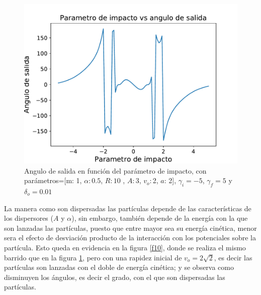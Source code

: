 \documentclass[11pt,letterpaper,twocolumn]{article}
\begin{document}
\begin{figure}[H]
\centering 
\includegraphics[scale=0.59]{g11.pdf}
\caption{Angulo de salida en función del parámetro de impacto, con parámetros=[m: 1, $\alpha: 0$.$5$, $R: 10$ , $A: 3$, $ v_{o}: $2, $a$: 2], $\gamma_{i}=-5$, $\gamma_{f}=5$ y $\delta_{o}=0.01$}
\label{f9}
\end{figure}    
\par 
La manera como son dispersadas las partículas depende de las características de los dispersores ($A$ y $\alpha$), sin embargo, también depende de la energía con la que son lanzadas las partículas, puesto que entre mayor sea su energía cinética, menor sera el efecto de desviación producto de la interacción con los potenciales sobre la partícula. Esto queda en evidencia en la figura \ref{f10}, donde se realiza el mismo barrido que en la figura \ref{f9}, pero con una rapidez inicial de $v_{o}=2 \sqrt{2}$, es decir las partículas son lanzadas con el doble de energía cinética; y se observa como disminuyen los ángulos, es decir el grado, con el que son dispersadas las partículas.\\  
  
\end{document}
